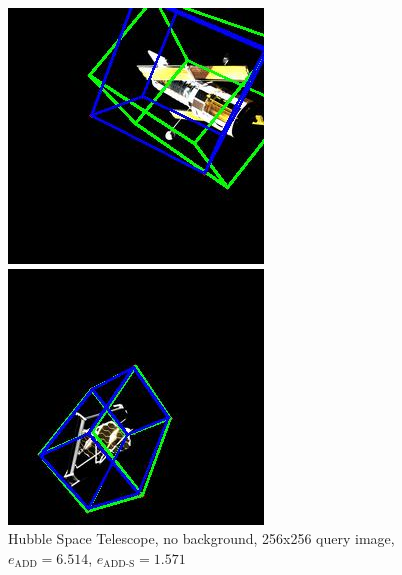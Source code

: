 \begin{figure}[h]
    \centering
    \begin{minipage}{0.45\linewidth}
        \centering
        \includegraphics[width=\linewidth]{data/fig7.jpg} %
        \caption{Hubble Space Telescope, no background, 256x256 query image, $e_\mathrm{ADD}=6.514$, $e_{\mathrm{ADD}\text{-}\mathrm{S}}=1.571$ }
        \label{fig:fig7}
    \end{minipage}\hfill
    \begin{minipage}{0.45\linewidth}
        \centering
        \includegraphics[width=\linewidth]{data/fig8.jpg} %

\end{minipage}
\end{figure}
